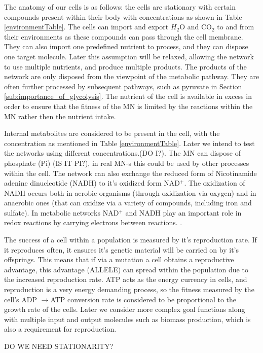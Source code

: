 \documentclass[a4paper,12pt]{article}
\begin{document}
	The anatomy of our cells is as follows: the cells are stationary with certain compounds present within their body with concentrations as shown in Table \ref{environmentTable}. The cells can import and export $H_2$O and CO$_2$ to and from their environments as these compounds can pass through the cell membrane. They can also import one predefined nutrient to process, and they can dispose one target molecule. Later this assumption will be relaxed, allowing the network to use multiple nutrients, and produce multiple products. The products of the network are only disposed from the viewpoint of the metabolic pathway. They are often further processed by subsequent pathways, such as pyruvate in Section \ref{sub:importance_of_glycolysis}. The nutrient of the cell is available in excess in order to ensure that the fitness of the MN is limited by the reactions within the MN rather then the nutrient intake. 
	
	Internal metabolites are considered to be present in the cell, with the concentration as mentioned in Table \ref{environmentTable}. Later we intend to test the networks using different concentrations.(DO I?). The MN can dispose of phosphate (Pi) (IS IT PI?), in real MN-s this could be used by other processes within the cell. The network can also exchange the reduced form of Nicotinamide adenine dinucleotide (NADH) to it's oxidized form NAD$^+$. The oxidization of NADH occurs both in aerobic organisms (through oxidization via oxygen) and in anaerobic ones (that can oxidize via a variety of compounds, including iron and sulfate). In metabolic networks NAD$^+$ and NADH play an important role in redox reactions by carrying electrons between reactions. \cite{principlesofbio}.

	The success of a cell within a population is measured by it's reproduction rate. If it reproduces often, it ensures it's genetic material will be carried on by it's offsprings. This means that if via a mutation a cell obtains a reproductive advantage, this advantage (ALLELE)  can spread within the population due to the increased reproduction rate. ATP acts as the energy currency in cells, and reproduction is a very energy demanding process, so the fitness  measured by the cell's ADP $\rightarrow$ATP conversion rate is considered to be proportional to the growth rate of the cells. Later we consider more complex goal functions along with multiple input and output molecules such as biomass production, which is also a requirement for reproduction. 

	DO WE NEED STATIONARITY?
\end{document}

